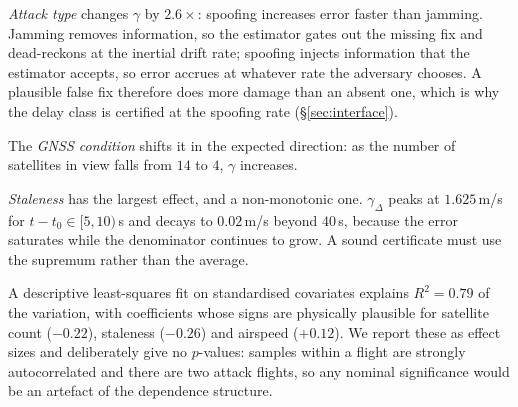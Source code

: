 \emph{Attack type} changes $\gamma$ by $2.6\times$: spoofing increases error
faster than jamming. Jamming removes information, so the estimator gates out the
missing fix and dead-reckons at the inertial drift rate; spoofing injects
information that the estimator accepts, so error accrues at whatever rate the
adversary chooses. A plausible false fix therefore does more damage than an
absent one, which is why the delay class is certified at the spoofing rate
(\S\ref{sec:interface}).

The \emph{GNSS condition} shifts it in the expected direction: as the
number of satellites in view falls from $14$ to $4$, $\gamma$ increases.

\emph{Staleness} has the largest effect, and a non-monotonic one.
$\gamma_{\Delta}$ peaks at $1.625$\,m/s for $t-t_0\in[5,10)$\,s and decays to
$0.02$\,m/s beyond $40$\,s, because the error saturates while the denominator
continues to grow. A sound certificate must use the supremum rather than the
average.

A descriptive least-squares fit on standardised covariates explains
$R^{2}=0.79$ of the variation, with coefficients whose signs are physically
plausible for satellite count ($-0.22$), staleness ($-0.26$) and airspeed
($+0.12$). We report these as effect sizes and deliberately give no $p$-values:
samples within a flight are strongly autocorrelated and there are two attack
flights, so any nominal significance would be an artefact of the dependence
structure.

\begin{table}[t]
\centering
\caption{Per-flight rates $\gamma$: the coarse calibration obtained from a
single scalar per flight. The $2.6\times$ spread across attack types is visible
here; the finer structure requires Table~\ref{tab:gammacamp}. Generated by
.}
\label{tab:gamma}
\small
\renewcommand{\arraystretch}{1.05}

\end{table}

\begin{table}[t]
\centering
\caption{Per-sample distribution of the baseline-corrected rate
$\gamma_{\Delta}$, binned by factor, over $674$ post-onset samples. Counts are
shown because coverage is uneven: airspeed bins above $1$\,m/s are
sparse, since these are hover flights. Generated by
.}
\label{tab:gammacamp}
\scriptsize
\renewcommand{\arraystretch}{1.02}

\end{table}

